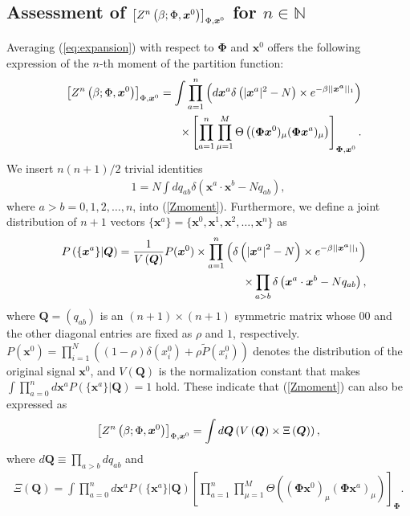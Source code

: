 \documentclass[12pt]{iopart}
\newcommand{\vm}[1]{\boldsymbol{#1}}
\begin{document}
\subsection{Assessment of $\left[Z^{n}\left(\beta; \Phi, \textrm{\boldmath $x$}^{0}\right)\right]_{\Phi,\textrm{\boldmath $x$}^{0}}$ for $n \in \mathbb{N}$}
Averaging (\ref{eq:expansion}) with respect to $\vm{\Phi}$ and $\vm{x}^0$ offers the following expression of the $n$-th moment of the partition function:
\begin{eqnarray}
&&\left[Z^{n}\left(\beta; \Phi, \textrm{\boldmath $x$}^{0}\right)\right]_{\Phi,\textrm{\boldmath $x$}^{0}}=
\int %
\prod_{a=1}^n \left (d \textrm{\boldmath $x$}^a\delta\left(\vert \textrm{\boldmath $x$}^a\vert^{2}-N\right) \times 
e^{-\beta||\textrm{\boldmath $x^a$}||_{1}} \right ) \cr
&& \hspace*{3cm} \times 
\left[\prod_{a=1}^n \prod_{\mu=1}^M 
\Theta\left(
(\vm{\Phi} \vm{x}^0)_\mu 
(\vm{\Phi} \vm{x}^a)_\mu 
\right)
\right]_{\vm{\Phi},\vm{x}^{0}}. 
\label{Zmoment}
\end{eqnarray}
We insert $n(n+1)/2$ trivial identities
\begin{eqnarray}
1=N \int dq_{ab} \delta \left (\vm{x}^a \cdot \vm{x}^b - N q_{ab} \right ), 
\end{eqnarray}
where $a>b=0,1,2,\ldots,n$, into (\ref{Zmoment}). Furthermore, we define a joint distribution of $n+1$ vectors $\{\vm{x}^a\}=\{\vm{x}^0, \vm{x}^1,\vm{x}^2,\ldots,\vm{x}^n \}$ as
\begin{eqnarray}
&&P\left (\{\vm{x}^a\} |\vm{Q}\right )= \frac{1}{V\left (\vm{Q}\right ) } P(\vm{x}^0) \times 
\prod_{a=1}^n \left (\delta \left (\left |\vm{x}^a\right |^2 -N \right ) 
\times 
e^{-\beta||\textrm{\boldmath $x^a$}||_{1}} \right )  \cr
&& \hspace*{3cm} \times \prod_{a>b} \delta \left (\vm{x}^a \cdot \vm{x}^b - N q_{ab} \right ), 
\label{replica_joint_dist}
\end{eqnarray}
where $\vm{Q}=(q_{ab})$ is an $(n+1) \times (n+1)$ symmetric matrix whose $00$ and the other diagonal entries are fixed as $\rho$ and $1$, respectively. $P(\vm{x}^0)=\prod_{i=1}^N \left ((1-\rho)\delta(x_i^0)+\rho \tilde{P}(x_i^0) \right )$ denotes the distribution of the original signal $\vm{x}^0$, and $V\left (\vm{Q}\right )$ is the normalization constant that makes $\int \prod_{a=0}^n d \vm{x}^a P\left (\{\vm{x}^a\} |\vm{Q}\right )=1$ hold. These indicate that (\ref{Zmoment}) can also be expressed as
\begin{eqnarray}
\left[Z^{n}\left(\beta; \Phi, \textrm{\boldmath $x$}^{0}\right)\right]_{\Phi,\textrm{\boldmath $x$}^{0}}
=\int d\vm{Q} \left (V\left (\vm{Q}\right ) \times \Xi\left (\vm{Q}\right ) \right ), 
\label{Zn}
\end{eqnarray}
where $d\vm{Q} \equiv \prod_{a>b}d q_{ab}$ and 
\begin{eqnarray}
\Xi\left (\vm{Q}\right )
=\int \prod_{a=0}^n d\vm{x}^a P\left (\{\vm{x}^a\} |\vm{Q} \right ) 
\left[\prod_{a=1}^n \prod_{\mu=1}^M 
\Theta\left(
(\vm{\Phi} \vm{x}^0)_\mu 
(\vm{\Phi} \vm{x}^a)_\mu 
\right)
\right]_{\vm{\Phi}}. 
\label{Xi}
\end{eqnarray}
\end{document}
